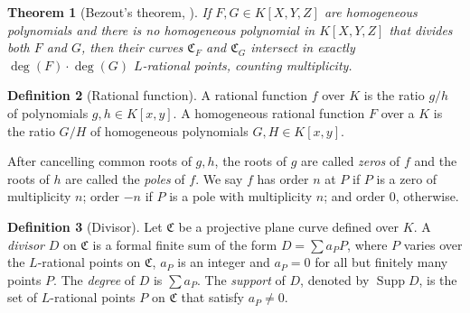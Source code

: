 \documentclass[11pt, oneside]{amsart}
\newtheorem{thm}{Theorem}[section]
\theoremstyle{definition}
\newtheorem{defn}[thm]{Definition}
\theoremstyle{remark}
\numberwithin{equation}{section}
\DeclareMathOperator{\Supp}{Supp}
\begin{document}
\begin{thm}[Bezout's theorem, \cite{Wal00}] %
	If $F, G \in K[X, Y, Z]$ are homogeneous polynomials and there is no homogeneous polynomial in $K[X, Y, Z]$ that divides both $F$ and $G$, then their curves $\mathfrak C_F$ and $\mathfrak C_G$ intersect in exactly $\deg(F) \cdot \deg(G)$ $L$-rational points, counting multiplicity.
\end{thm}

\begin{defn}[Rational function]
	A rational function $f$ over $K$ is the ratio $g/h$ of polynomials $g, h \in K[x, y]$.
	A homogeneous rational function $F$ over a $K$ is the ratio $G/H$ of homogeneous polynomials $G, H \in K[x, y]$.

	After cancelling common roots of $g, h$, the roots of $g$ are called \emph{zeros} of $f$ and the roots of $h$ are called the \emph{poles} of $f$.  
	We say $f$ has order $n$ at $P$ if $P$ is a zero of multiplicity $n$; order $-n$ if $P$ is a pole with multiplicity $n$; and order $0$, otherwise.
\end{defn}

\begin{defn}[Divisor] 
	Let $\mathfrak C$ be a projective plane curve defined over $K$.
	A \emph{divisor} $D$ on $\mathfrak C$ is a formal finite sum of the form $D = \sum a_P P$, where $P$ varies over the $L$-rational points on $\mathfrak C$, $a_P$ is an integer and $a_P = 0$ for all but finitely many points $P$.
	The \emph{degree} of $D$ is $\sum a_P$.
	The \emph{support} of $D$, denoted by $\Supp D$, is the set of $L$-rational points $P$ on $\mathfrak C$ that satisfy $a_P \neq 0$.
\end{defn}

\end{document}
